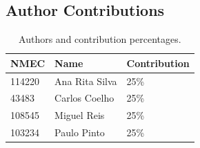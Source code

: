 \subsection{Author Contributions}
\label{sec:authors}

\begin{table}[H]
\caption{Authors and contribution percentages.}
\label{tab:authors}
\centering
\renewcommand{\arraystretch}{1.2}
\begin{tabular}{lll}
\toprule
\textbf{NMEC} & \textbf{Name} & \textbf{Contribution} \\
\midrule
114220 & Ana Rita Silva  & 25\% \\
43483  & Carlos Coelho   & 25\% \\
108545 & Miguel Reis     & 25\% \\
103234 & Paulo Pinto     & 25\% \\
\bottomrule
\end{tabular}
\end{table}

